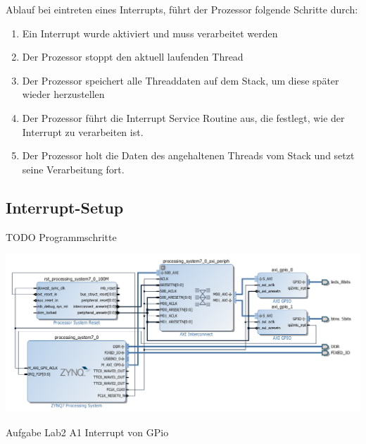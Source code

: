 Ablauf bei eintreten eines Interrupts, führt der Prozessor folgende Schritte durch: 
\begin{enumerate}
  \item Ein Interrupt wurde aktiviert und muss verarbeitet werden
  \item Der Prozessor stoppt den aktuell laufenden Thread
  \item Der Prozessor speichert alle Threaddaten auf dem Stack, um diese später wieder herzustellen
  \item Der Prozessor führt die Interrupt Service Routine aus, die festlegt, wie der Interrupt zu verarbeiten ist.
  \item Der Prozessor holt die Daten des angehaltenen Threads vom Stack und setzt seine Verarbeitung fort.
\end{enumerate}

 \subsection{Interrupt-Setup}
 
 TODO Programmschritte
 
 \begin{minipage}{\textwidth}
    \begin{center}        
        \includegraphics[scale=0.58]{img/lab2a1.png} 
    \end{center}
\end{minipage}
\begin{center}
Aufgabe Lab2 A1 Interrupt von GPio
\end{center}
 
 
 
